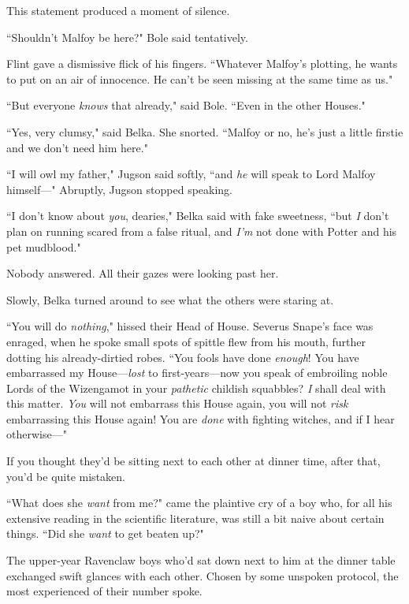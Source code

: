 This statement produced a moment of silence.

``Shouldn't Malfoy be here?" Bole said tentatively.

Flint gave a dismissive flick of his fingers. ``Whatever Malfoy's plotting, he wants to put on an air of innocence. He can't be seen missing at the same time as us."

``But everyone \emph{knows} that already," said Bole. ``Even in the other Houses."

``Yes, very clumsy," said Belka. She snorted. ``Malfoy or no, he's just a little firstie and we don't need him here."

``I will owl my father," Jugson said softly, ``and \emph{he} will speak to Lord Malfoy himself—" Abruptly, Jugson stopped speaking.

``I don't know about \emph{you}, dearies," Belka said with fake sweetness, ``but \emph{I} don't plan on running scared from a false ritual, and \emph{I'm} not done with Potter and his pet mudblood."

Nobody answered. All their gazes were looking past her.

Slowly, Belka turned around to see what the others were staring at.

``You will do \emph{nothing}," hissed their Head of House. Severus Snape's face was enraged, when he spoke small spots of spittle flew from his mouth, further dotting his already-dirtied robes. ``You fools have done \emph{enough}! You have embarrassed my House—\emph{lost} to first-years—now you speak of embroiling noble Lords of the Wizengamot in your \emph{pathetic} childish squabbles? \emph{I} shall deal with this matter. \emph{You} will not embarrass this House again, you will not \emph{risk} embarrassing this House again! You are \emph{done} with fighting witches, and if I hear otherwise—"

\later

If you thought they'd be sitting next to each other at dinner time, after that, you'd be quite mistaken.

``What does she \emph{want} from me?" came the plaintive cry of a boy who, for all his extensive reading in the scientific literature, was still a bit naive about certain things. ``Did she \emph{want} to get beaten up?"

The upper-year Ravenclaw boys who'd sat down next to him at the dinner table exchanged swift glances with each other. Chosen by some unspoken protocol, the most experienced of their number spoke.

